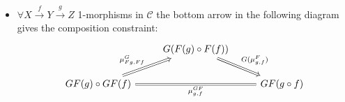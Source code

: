 \begin{defi}
\begin{itemize}
\begin{itemize}
			\item 
			$ \forall X \xrightarrow{ f } Y \xrightarrow{ g } Z$ 
			1-morphisms in $ \mathcal{ C }$ the bottom arrow in the following diagram gives the composition constraint:
			\[
			\begin{tikzcd}
				&
				G ( F ( g ) \circ F ( f ) )
				\ar[rd, Rightarrow, " G ( \mu_{ g , f }^F) "]
				\\
				GF ( g ) \circ GF ( f ) 
				\ar[ru, Rightarrow, " \mu_{ F g , F f }^G"]
				\ar[rr, Rightarrow, equal, " \mu_{ g , f }^{ G F }"']
				&&
				GF ( g \circ f )
			\end{tikzcd}
			\]
		\end{itemize}
	\end{itemize}
\end{defi}

